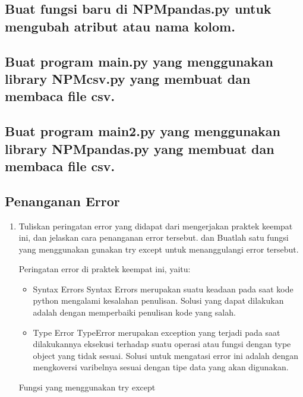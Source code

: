 \subsection{Buat fungsi baru di NPMpandas.py untuk mengubah atribut atau nama kolom.}


\subsection{Buat program main.py yang menggunakan library NPMcsv.py yang membuat dan membaca file csv.}


\subsection{Buat program main2.py yang menggunakan library NPMpandas.py yang membuat dan membaca file csv.}


\subsection{Penanganan Error}
\begin{enumerate}
	\item Tuliskan  peringatan  error  yang  didapat  dari  mengerjakan  praktek  keempat  ini, dan  jelaskan  cara  penanganan  error  tersebut.   dan  Buatlah  satu  fungsi  yang menggunakan gunakan try except untuk menanggulangi error tersebut.
	
	Peringatan error di praktek keempat ini, yaitu:
	\begin{itemize}
		\item Syntax Errors
		Syntax Errors merupakan suatu keadaan pada saat kode python mengalami kesalahan penulisan. Solusi yang dapat dilakukan adalah dengan memperbaiki penulisan kode yang salah.
		
		\item Type Error
		TypeError merupakan exception yang terjadi pada saat dilakukannya eksekusi terhadap suatu operasi atau fungsi dengan type object yang tidak sesuai. Solusi untuk mengatasi error ini adalah dengan mengkoversi varibelnya sesuai dengan tipe data yang akan digunakan.
	\end{itemize}
	
	Fungsi yang menggunakan try except
	
\end{enumerate}

